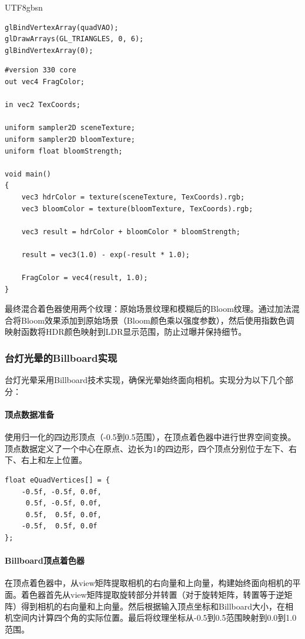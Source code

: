 \documentclass{article}
\begin{document}
\begin{CJK}{UTF8}{gbsn}
\begin{enumerate}
\begin{lstlisting}[caption=最终混合实现]
glBindVertexArray(quadVAO);
glDrawArrays(GL_TRIANGLES, 0, 6);
glBindVertexArray(0);
    \end{lstlisting}

    \begin{lstlisting}[caption=最终混合着色器]
#version 330 core
out vec4 FragColor;

in vec2 TexCoords;

uniform sampler2D sceneTexture;
uniform sampler2D bloomTexture;
uniform float bloomStrength;

void main()
{
    vec3 hdrColor = texture(sceneTexture, TexCoords).rgb;
    vec3 bloomColor = texture(bloomTexture, TexCoords).rgb;
    
    vec3 result = hdrColor + bloomColor * bloomStrength;
    
    result = vec3(1.0) - exp(-result * 1.0);
    
    FragColor = vec4(result, 1.0);
}
    \end{lstlisting}

    最终混合着色器使用两个纹理：原始场景纹理和模糊后的Bloom纹理。通过加法混合将Bloom效果添加到原始场景（Bloom颜色乘以强度参数），然后使用指数色调映射函数将HDR颜色映射到LDR显示范围，防止过曝并保持细节。
\end{enumerate}

\subsubsection{台灯光晕的Billboard实现}
台灯光晕采用Billboard技术实现，确保光晕始终面向相机。实现分为以下几个部分：

\paragraph{顶点数据准备}
使用归一化的四边形顶点（-0.5到0.5范围），在顶点着色器中进行世界空间变换。顶点数据定义了一个中心在原点、边长为1的四边形，四个顶点分别位于左下、右下、右上和左上位置。

\begin{lstlisting}[caption=台灯光晕顶点数据]
float eQuadVertices[] = {
    -0.5f, -0.5f, 0.0f,
     0.5f, -0.5f, 0.0f,
     0.5f,  0.5f, 0.0f,
    -0.5f,  0.5f, 0.0f
};
\end{lstlisting}

\paragraph{Billboard顶点着色器}
在顶点着色器中，从view矩阵提取相机的右向量和上向量，构建始终面向相机的平面。着色器首先从view矩阵提取旋转部分并转置（对于旋转矩阵，转置等于逆矩阵）得到相机的右向量和上向量。然后根据输入顶点坐标和Billboard大小，在相机空间内计算四个角的实际位置。最后将纹理坐标从-0.5到0.5范围映射到0.0到1.0范围。


\end{CJK}
\end{document}
